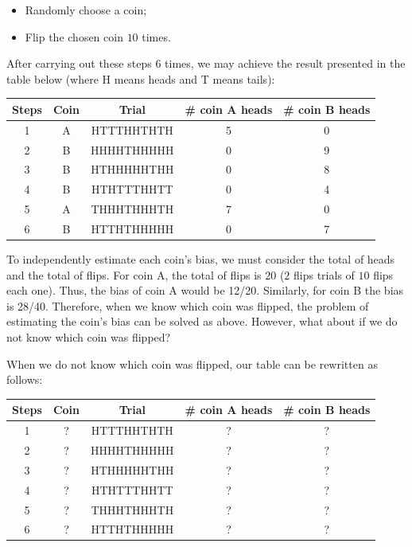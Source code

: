 \begin{itemize}
    \item Randomly choose a coin;
    \item Flip the chosen coin $10$ times.
\end{itemize}

After carrying out these steps $6$ times, we may achieve the result presented in the table below (where H means heads and T means tails):

\begin{center}
\begin{tabular}{|c|c|c|c|c|} 
 \hline
 \textbf{Steps} &\textbf{Coin} & \textbf{Trial} & \textbf{\# coin A heads} & \textbf{\# coin B heads} \\ \hline 
1 & A & HTTTHHTHTH & 5 & 0\\ \hline 
2 & B & HHHHTHHHHH & 0 & 9\\ \hline
3 & B & HTHHHHHTHH	& 0 & 8\\ \hline 
4 & B & HTHTTTHHTT & 0 & 4\\ \hline
5 & A & THHHTHHHTH & 7 & 0\\ \hline 
6 & B & HTTHTHHHHH & 0 & 7\\ \hline
\end{tabular}
\end{center}

To independently estimate each coin's bias, we must consider the total of heads and the total of flips. For coin A, the total of flips is $20$ ($2$ flips trials of $10$ flips each one). Thus, the bias of coin A would be 12/20. Similarly, for coin B the bias is 28/40. Therefore, when we know which coin was flipped, the problem of estimating the coin's bias can be solved as above. However, what about if we do not know which coin was flipped?

When we do not know which coin was flipped, our table can be rewritten as follows:

\begin{center}
\begin{tabular}{|c|c|c|c|c|} 
 \hline
 \textbf{Steps} & \textbf{Coin} & \textbf{Trial} & \textbf{\# coin A heads} & \textbf{\# coin B heads} \\ \hline 
1 & ? & HTTTHHTHTH & ? & ?\\ \hline 
2 & ? & HHHHTHHHHH & ? & ?\\ \hline
3 & ? & HTHHHHHTHH	& ? & ?\\ \hline 
4 & ? & HTHTTTHHTT & ? & ?\\ \hline
5 & ? & THHHTHHHTH & ? & ?\\ \hline 
6 & ? & HTTHTHHHHH & ? & ?\\ \hline
\end{tabular}
\end{center}


